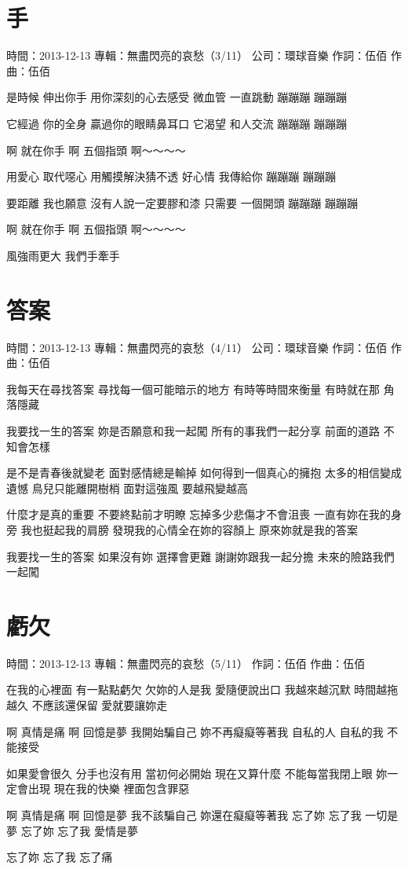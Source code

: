 \documentclass[UTF8,a4paper,oneside,twocolumn,12pt]{ctexbook}
\newcommand{\infopair}[2]{\textbullet #1：#2}
\newcommand{\zc}[1][伍佰]{\infopair{作詞}{#1}}
\newcommand{\zq}[1][伍佰]{\infopair{作曲}{#1}}
\newcommand{\zj}[1]{\infopair{專輯}{#1}}
\newcommand{\sj}[1]{\infopair{時間}{#1}}
\newcommand{\gs}[1]{\infopair{公司}{#1}}
\newenvironment{info}{\begin{flushleft}\kaishu
	}
	{\end{flushleft}\normalsize\yahei\par}
\newenvironment{lyric}{
	}
{}
\begin{document}
\section{手}
\begin{info}
	\sj{2013-12-13}
	\zj{無盡閃亮的哀愁（3/11）}
	\gs{環球音樂}
	\zc
	\zq
\end{info}
\begin{lyric}
	是時候 伸出你手
	用你深刻的心去感受
	微血管 一直跳動
	蹦蹦蹦 蹦蹦蹦

	它經過 你的全身
	贏過你的眼睛鼻耳口
	它渴望 和人交流
	蹦蹦蹦 蹦蹦蹦

	啊 就在你手
	啊 五個指頭
	啊～～～～

	用愛心 取代噁心
	用觸摸解決猜不透
	好心情 我傳給你
	蹦蹦蹦 蹦蹦蹦

	要距離 我也願意
	沒有人說一定要膠和漆
	只需要 一個開頭
	蹦蹦蹦 蹦蹦蹦

	啊 就在你手
	啊 五個指頭
	啊～～～～

	風強雨更大
	我們手牽手
\end{lyric}

\section{答案}
\begin{info}
	\sj{2013-12-13}
	\zj{無盡閃亮的哀愁（4/11）}
	\gs{環球音樂}
	\zc
	\zq
\end{info}
\begin{lyric}
	我每天在尋找答案
	尋找每一個可能暗示的地方
	有時等時間來衡量
	有時就在那 角落隱藏

	我要找一生的答案
	妳是否願意和我一起闖
	所有的事我們一起分享
	前面的道路 不知會怎樣

	是不是青春後就變老 面對感情總是輸掉
	如何得到一個真心的擁抱
	太多的相信變成遺憾 鳥兒只能離開樹梢
	面對這強風 要越飛變越高

	什麼才是真的重要 不要終點前才明瞭
	忘掉多少悲傷才不會沮喪
	一直有妳在我的身旁 我也挺起我的肩膀
	發現我的心情全在妳的容顏上
	原來妳就是我的答案

	我要找一生的答案
	如果沒有妳 選擇會更難
	謝謝妳跟我一起分擔
	未來的險路我們一起闖
\end{lyric}

\section{虧欠}
\begin{info}
	\sj{2013-12-13}
	\zj{無盡閃亮的哀愁（5/11）}
	\zc
	\zq
\end{info}
\begin{lyric}
	在我的心裡面 有一點點虧欠
	欠妳的人是我 愛隨便說出口
	我越來越沉默 時間越拖越久
	不應該還保留 愛就要讓妳走

	啊 真情是痛
	啊 回憶是夢
	我開始騙自己 妳不再癡癡等著我
	自私的人 自私的我 不能接受

	如果愛會很久 分手也沒有用
	當初何必開始 現在又算什麼
	不能每當我閉上眼 妳一定會出現
	現在我的快樂 裡面包含罪惡

	啊 真情是痛
	啊 回憶是夢
	我不該騙自己 妳還在癡癡等著我
	忘了妳 忘了我 一切是夢
	忘了妳 忘了我 愛情是夢

	忘了妳 忘了我 忘了痛
\end{lyric}
\end{document}
